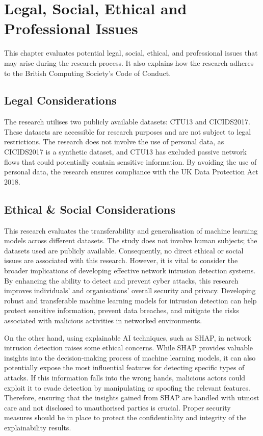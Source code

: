 \chapter{Legal, Social, Ethical and Professional Issues}
This chapter evaluates potential legal, social, ethical, and professional issues that may arise during the research process. It also explains how the research adheres to the British Computing Society's Code of Conduct.

\section{Legal Considerations}
The research utilises two publicly available datasets: CTU13\cite{garcia2014empirical} and CICIDS2017\cite{sharafaldin2018toward}. These datasets are accessible for research purposes and are not subject to legal restrictions. The research does not involve the use of personal data, as CICIDS2017 is a synthetic dataset, and CTU13 has excluded passive network flows that could potentially contain sensitive information. By avoiding the use of personal data, the research ensures compliance with the UK Data Protection Act 2018.

\section{Ethical \& Social Considerations}
This research evaluates the transferability and generalisation of machine learning models across different datasets. The study does not involve human subjects; the datasets used are publicly available. Consequently, no direct ethical or social issues are associated with this research. However, it is vital to consider the broader implications of developing effective network intrusion detection systems. By enhancing the ability to detect and prevent cyber attacks, this research improves individuals' and organisations' overall security and privacy. Developing robust and transferable machine learning models for intrusion detection can help protect sensitive information, prevent data breaches, and mitigate the risks associated with malicious activities in networked environments.

On the other hand, using explainable AI techniques, such as SHAP, in network intrusion detection raises some ethical concerns. While SHAP provides valuable insights into the decision-making process of machine learning models, it can also potentially expose the most influential features for detecting specific types of attacks. If this information falls into the wrong hands, malicious actors could exploit it to evade detection by manipulating or spoofing the relevant features. Therefore, ensuring that the insights gained from SHAP are handled with utmost care and not disclosed to unauthorised parties is crucial. Proper security measures should be in place to protect the confidentiality and integrity of the explainability results.

